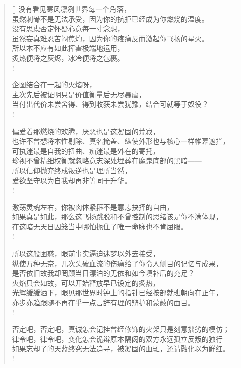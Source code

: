 \documentclass[UTF8, 12pt, a4paper]{ctexrep} %
\begin{document}
\begin{verse}[\versewidth]
没有看见寒风凛冽世界每一个角落，\\
虽然刺骨不是无法承受，因为你的抗拒已经成为你燃烧的温度。\\
没有思虑否定怀疑心意每一寸念想，\\
虽然妄真难忍苦闷焦灼，因为你的疼痛反而激起你飞扬的星火。\\
所以本不应有如此挥霍极端地运用，\\
炙热便将之灰烬，冰冷便将之包裹。\\!

企图结合在一起的火焰呀，\\
主次先后被证明只是价值衡量后无尽暴虐，\\
当付出代价未尝舍得、得到收获未尝犹豫，结合可就等于奴役？\\!

偏爱着那燃烧的欢腾，厌恶也是这凝固的荒寂，\\
也许不曾想将本性剔除、真名掩盖、纵使外形也与核心一样帷幕遮拦，\\
可执迷最是自我的扭曲、痴迷最是外在的寄托，\\
珍视不曾精细权衡就忽略意志深处埋葬在魔鬼底部的黑暗——\\
所以信仰抛弃终成叛逆也是理所当然，\\
爱欲坚守以为自我却再非等同于升华。\\!

激荡灵魂左右，你被肉体紧箍不是意志抉择的自由，\\
如果真是如此，那么这飞扬跳脱和不曾控制的思绪该是你不满体现，\\
在这暗无天日囚笼当中哪怕扼住了唯一命脉也不肯屈服。\\!

所以这般困惑，眼前事实逼迫迷梦以外去接受，\\
纵使万种无奈，几次头破血流的伤痛给了你令人侧目的记忆与成果，\\
是否依旧故我却罔顾当日漂泊的无依和如今填补后的充足？\\
火焰只会如故，可以开始释放早已设定的炙热，\\
光辉缓缓洒下，眼见那世界时钟上的指针已经按部就班朝向在正午，\\
亦步亦趋跟随不再在乎一点言辞有理的辩护和蒙蔽的面目。\\!

否定吧，否定吧，真诚怎会记挂曾经修饰的火架只是刻意拙劣的模仿；\\
律令吧，律令吧，变化怎会诡辩原本隔阂的双方永远孤立反叛的独行——\\
如果忘却了的天蓝终究无法追寻，被凝固的血斑，还请融化以为鲜红。\\!


\end{verse}
\end{document}
